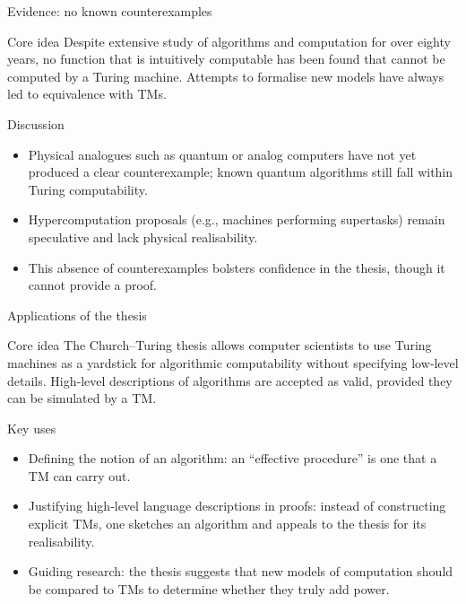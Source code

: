 \begin{frame}[t]{Evidence: no known counterexamples}
  \begin{tblock}{Core idea}
    Despite extensive study of algorithms and computation for over
    eighty years, no function that is intuitively computable has
    been found that cannot be computed by a Turing machine.  Attempts
    to formalise new models have always led to equivalence with TMs.
  \end{tblock}
  \begin{tblock}{Discussion}
    \begin{itemize}
      \item Physical analogues such as quantum or analog computers have
        not yet produced a clear counterexample; known quantum
        algorithms still fall within Turing computability.
      \item Hypercomputation proposals (e.g., machines performing
        supertasks) remain speculative and lack physical realisability.
      \item This absence of counterexamples bolsters confidence in
        the thesis, though it cannot provide a proof.
    \end{itemize}
  \end{tblock}
  \label{fr:7.6-05}
\end{frame}

\begin{frame}[t]{Applications of the thesis}
  \begin{tblock}{Core idea}
    The Church–Turing thesis allows computer scientists to use Turing
    machines as a yardstick for algorithmic computability without
    specifying low‑level details.  High‑level descriptions of
    algorithms are accepted as valid, provided they can be simulated
    by a TM.
  \end{tblock}
  \begin{tblock}{Key uses}
    \begin{itemize}
      \item Defining the notion of an algorithm: an “effective
        procedure” is one that a TM can carry out.
      \item Justifying high‑level language descriptions in proofs:
        instead of constructing explicit TMs, one sketches an algorithm
        and appeals to the thesis for its realisability.
      \item Guiding research: the thesis suggests that new models of
        computation should be compared to TMs to determine whether
        they truly add power.
    \end{itemize}
  \end{tblock}
  \label{fr:7.6-06}
\end{frame}

